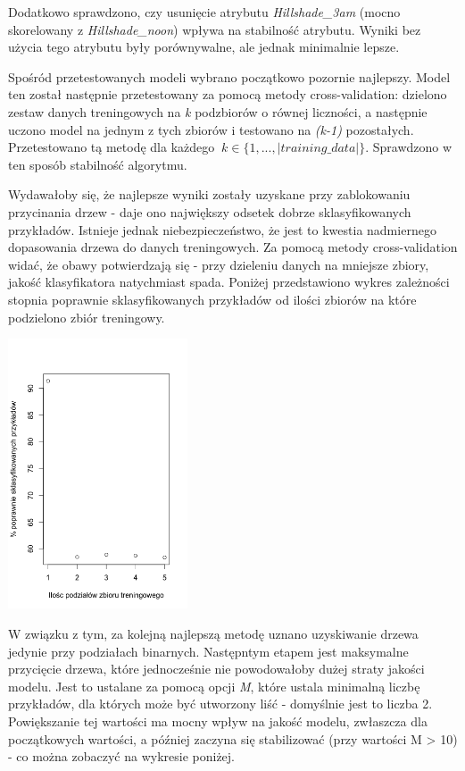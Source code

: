 \documentclass[11pt]{article} %
\begin{document}
Dodatkowo sprawdzono, czy usunięcie atrybutu \emph{Hillshade\_3am} (mocno skorelowany z  \emph{Hillshade\_noon}) wpływa na stabilność atrybutu. Wyniki bez użycia tego atrybutu były porównywalne, ale jednak minimalnie lepsze.

Spośród przetestowanych modeli wybrano początkowo pozornie najlepszy. Model ten został następnie przetestowany za pomocą metody cross-validation: dzielono zestaw danych treningowych na \emph{k} podzbiorów o równej liczności, a następnie uczono model na jednym z tych zbiorów i testowano na \emph{(k-1)} pozostałych. Przetestowano tą metodę dla każdego $\ k \in \{1, ..., |training\_data|\} $. Sprawdzono w ten sposób stabilność algorytmu.

Wydawałoby się, że najlepsze wyniki zostały uzyskane przy zablokowaniu przycinania drzew - daje ono największy odsetek dobrze sklasyfikowanych przykładów. Istnieje jednak niebezpieczeństwo, że jest to kwestia nadmiernego dopasowania drzewa do danych treningowych. Za pomocą metody cross-validation widać, że obawy potwierdzają się - przy dzieleniu danych na mniejsze zbiory, jakość klasyfikatora natychmiast spada. Poniżej przedstawiono wykres zależności stopnia poprawnie sklasyfikowanych przykładów od ilości zbiorów na które podzielono zbiór treningowy.

\begin{center}
	\includegraphics[height=8cm]{unprunned-overfitting}
\end{center}

W związku z tym, za kolejną najlepszą metodę uznano uzyskiwanie drzewa jedynie przy podziałach binarnych. Następntym etapem jest maksymalne przycięcie drzewa, które jednocześnie nie powodowałoby dużej straty jakości modelu. Jest to ustalane za pomocą opcji \emph{M}, które ustala minimalną liczbę przykładów, dla których może być utworzony liść - domyślnie jest to liczba 2. Powiększanie tej wartości ma mocny wpływ na jakość modelu, zwłaszcza dla początkowych wartości, a później zaczyna się stabilizować (przy wartości M > 10) - co można zobaczyć na wykresie poniżej.
\end{document}
